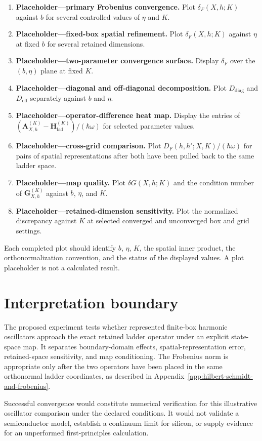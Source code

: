 \begin{enumerate}
    \item \textbf{Placeholder---primary Frobenius convergence.} Plot
          $\delta_F(X,h;K)$ against $b$ for several controlled values of
          $\eta$ and $K$.
    \item \textbf{Placeholder---fixed-box spatial refinement.} Plot
          $\delta_F(X,h;K)$ against $\eta$ at fixed $b$ for several retained
          dimensions.
    \item \textbf{Placeholder---two-parameter convergence surface.} Display
          $\delta_F$ over the $(b,\eta)$ plane at fixed $K$.
    \item \textbf{Placeholder---diagonal and off-diagonal decomposition.}
          Plot $D_{\mathrm{diag}}$ and $D_{\mathrm{off}}$ separately against
          $b$ and $\eta$.
    \item \textbf{Placeholder---operator-difference heat map.} Display the
          entries of
          $\left(\mathbf A_{X,h}^{(K)}-
          \mathbf H_{\mathrm{lad}}^{(K)}\right)/(\hbar\omega)$ for selected
          parameter values.
    \item \textbf{Placeholder---cross-grid comparison.} Plot
          $D_F(h,h';X,K)/(\hbar\omega)$ for pairs of spatial representations
          after both have been pulled back to the same ladder space.
    \item \textbf{Placeholder---map quality.} Plot $\delta G(X,h;K)$ and the
          condition number of $\mathbf G_{X,h}^{(K)}$ against $b$, $\eta$, and
          $K$.
    \item \textbf{Placeholder---retained-dimension sensitivity.} Plot the
          normalized discrepancy against $K$ at selected converged and
          unconverged box and grid settings.
\end{enumerate}
Each completed plot should identify $b$, $\eta$, $K$, the spatial inner
product, the orthonormalization convention, and the status of the displayed
values. A plot placeholder is not a calculated result.

\section*{Interpretation boundary}

The proposed experiment tests whether represented finite-box harmonic
oscillators approach the exact retained ladder operator under an explicit
state-space map. It separates boundary-domain effects, spatial-representation
error, retained-space sensitivity, and map conditioning. The Frobenius norm is
appropriate only after the two operators have been placed in the same
orthonormal ladder coordinates, as described in
Appendix~\ref{app:hilbert-schmidt-and-frobenius}.

Successful convergence would constitute numerical verification for this
illustrative oscillator comparison under the declared conditions. It would not
validate a semiconductor model, establish a continuum limit for silicon, or
supply evidence for an unperformed first-principles calculation.
